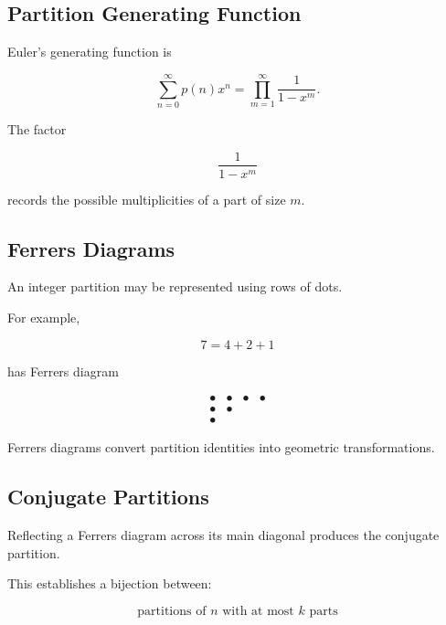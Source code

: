 \subsection{Partition Generating Function}
\label{subsec:partition-generating-function-enumerative}

Euler's generating function is

\[
\boxed{
\sum_{n=0}^{\infty}p(n)x^n
=
\prod_{m=1}^{\infty}\frac{1}{1-x^m}.
}
\]

The factor

\[
\frac{1}{1-x^m}
\]

records the possible multiplicities of a part of size \(m\).

\subsection{Ferrers Diagrams}
\label{subsec:ferrers-diagrams}

An integer partition may be represented using rows of dots.

For example,

\[
7=4+2+1
\]

has Ferrers diagram

\[
\begin{array}{cccc}
\bullet & \bullet & \bullet & \bullet\\
\bullet & \bullet\\
\bullet
\end{array}
\]

Ferrers diagrams convert partition identities into geometric
transformations.

\subsection{Conjugate Partitions}
\label{subsec:conjugate-partitions}

Reflecting a Ferrers diagram across its main diagonal produces the
conjugate partition.

This establishes a bijection between:

\[
\boxed{
\text{partitions of }n\text{ with at most }k\text{ parts}
}
\]

